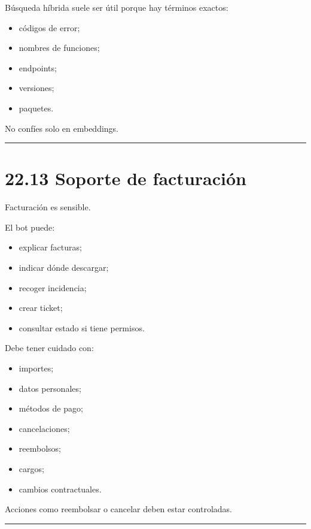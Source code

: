 Búsqueda híbrida suele ser útil porque hay términos exactos:

\begin{itemize}
\tightlist
\item
  códigos de error;
\item
  nombres de funciones;
\item
  endpoints;
\item
  versiones;
\item
  paquetes.
\end{itemize}

No confíes solo en embeddings.

\begin{center}\rule{0.5\linewidth}{0.5pt}\end{center}

\section{22.13 Soporte de facturación}\label{soporte-de-facturaciuxf3n}

Facturación es sensible.

El bot puede:

\begin{itemize}
\tightlist
\item
  explicar facturas;
\item
  indicar dónde descargar;
\item
  recoger incidencia;
\item
  crear ticket;
\item
  consultar estado si tiene permisos.
\end{itemize}

Debe tener cuidado con:

\begin{itemize}
\tightlist
\item
  importes;
\item
  datos personales;
\item
  métodos de pago;
\item
  cancelaciones;
\item
  reembolsos;
\item
  cargos;
\item
  cambios contractuales.
\end{itemize}

Acciones como reembolsar o cancelar deben estar controladas.

\begin{center}\rule{0.5\linewidth}{0.5pt}\end{center}

